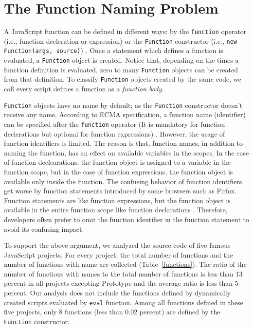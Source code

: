 \documentclass{acm_proc_article-sp}
\begin{document}
\section{The Function Naming Problem}

A JavaScript function can be defined in different ways: by the {\small\texttt{function}} operator (i.e., function decleration or expression) or the {\small\texttt{Function}} constructor (i.e., {\small\texttt{new Function(args, source)}}) \cite{ECMA}. Once a statement which defines a function is evaluated, a {\small\texttt{Function}} object is created. Notice that, depending on the times a function definition is evaluated, zero to many {\small\texttt{Function}} objects can be created from that definition. To classify {\small\texttt{Function}} objects created by the same code, we call every script defines a function as a \textit{function body}. 

{\small\texttt{Function}} objects have no name by default; as the {\small\texttt{Function}} constructor doesn't receive any name. According to ECMA specification, a function name (identifier) can be specified after the {\small\texttt{function}} operator (It is mandatory for function declerations but optional for function expressions) \cite{ECMA}. However, the usage of function identifiers is limited. The reason is that, function names, in addition to naming the function, has an effect on available variables in the scopes. In the case of function declearations, the function object is assigned to a variable in the function scope, but in the case of function expressions, the function object is available only inside the function. The confusing behavior of function identifiers get worse by function statements introduced by some browsers such as Firfox. Function statements are like function expressions, but the function object is available in the entire function scope like function declarations \cite{Zaytsev}. Therefore, developers often prefer to omit the function identifier in the function statement to avoid its confusing impact.

To support the above argument, we analyzed the source code of five famous JavaScript projects. For every project, the total number of functions and the number of functions with name are collected (Table~\ref{functions}). The ratio of the number of functions with names to the total number of functions is less than 13 percent in all projects excepting Prototype and the average ratio is less than 5 percent. Our analysis does not include the functions defined by dynamically created scripts evaluated by {\small\texttt{eval}} function. Among all functions defined in these five projects, only 8 functions (less than 0.02 percent) are defined by the {\small\texttt{Function}} constructor. 
\end{document}

